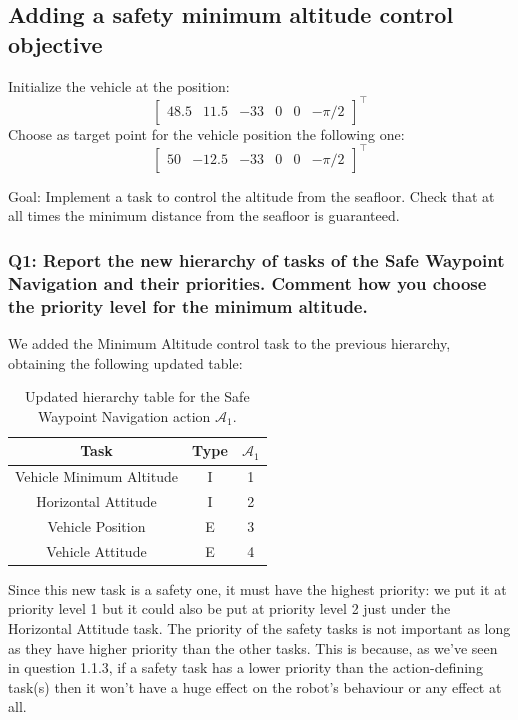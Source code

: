 \documentclass{article}
\begin{document}
\subsection{Adding a safety minimum altitude control objective}
Initialize the vehicle at the position:
\begin{displaymath}
\begin{bmatrix} 48.5 & 11.5 & -33 & 0 & 0 &-\pi/2\end{bmatrix}^\top
\end{displaymath}
Choose as target point for the vehicle position the following one:
\begin{displaymath}
\begin{bmatrix} 50 & -12.5 & -33 & 0 & 0 & -\pi/2 \end{bmatrix}^\top
\end{displaymath}

Goal: Implement a task to control the altitude from the seafloor. Check that at all times the minimum distance from the seafloor is guaranteed.


\subsubsection{Q1: Report the new hierarchy of tasks of the Safe Waypoint Navigation and their priorities. Comment how you choose the priority level for the minimum altitude.}
We added the Minimum Altitude control task to the previous hierarchy, obtaining the following updated table:

\begin{table}[htb]
	\caption{Updated hierarchy table for the Safe Waypoint Navigation action $\mathcal{A}_{1}$.}
	\label{tb2:ex1.2.1SafeWaypointNavigationTable}
	\begin{center}
		\footnotesize
		\begin{tabular}{ccc}
			\toprule
			Task & Type & $\mathcal{A}_{1}$ \\
			\midrule
			Vehicle Minimum Altitude & I & 1 \\
			\hdashline
			Horizontal Attitude      & I & 2 \\
			\hdashline
			Vehicle Position 	     & E & 3 \\
			\hdashline
			Vehicle Attitude         & E & 4 \\
			\bottomrule
		\end{tabular}
	\end{center}
\end{table}
Since this new task is a safety one, it must have the highest priority: we put it at priority level 1 but it could also be put at priority level 2 just under the Horizontal Attitude task. The priority of the safety tasks is not important as long as they have higher priority than the other tasks. This is because, as we've seen in question 1.1.3, if a safety task has a lower priority than the action-defining task(s) then it won't have a huge effect on the robot's behaviour or any effect at all.
\end{document}
